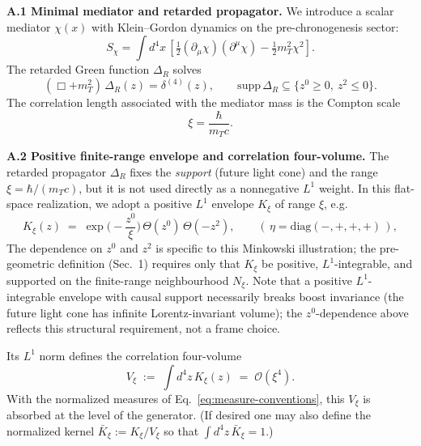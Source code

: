 \documentclass[12pt,a4paper]{article}
\numberwithin{equation}{section}
\begin{document}
\vspace{0.3cm}
\noindent\textbf{A.1 Minimal mediator and retarded propagator.}
We introduce a scalar mediator $\chi(x)$ with Klein--Gordon dynamics on the pre-chronogenesis sector:
\begin{equation}
S_\chi=\!\int d^4x\,\left[\tfrac12(\partial_\mu \chi)(\partial^\mu \chi)-\tfrac12 m_T^2 \chi^2\right].
\tag{A.1}
\end{equation}
The retarded Green function \(\Delta_R\) solves
\begin{equation}
(\Box+m_T^2)\,\Delta_R(z)=\delta^{(4)}(z),\qquad \mathrm{supp}\,\Delta_R\subseteq\{z^0\ge 0,\ z^2\le 0\}.
\tag{A.2}
\end{equation}
The correlation length associated with the mediator mass is the Compton scale
\begin{equation}
\xi=\frac{\hbar}{m_T c}.
\tag{A.3}\label{eq:scales-mediatormass}
\end{equation}

\vspace{0.3cm}
\noindent\textbf{A.2 Positive finite-range envelope and correlation four-volume.}
The retarded propagator $\Delta_R$ fixes the \emph{support} (future light cone) and the
range $\xi=\hbar/(m_Tc)$, but it is not used directly as a nonnegative $L^1$ weight.
In this flat-space realization, we adopt a positive $L^1$ envelope $K_\xi$ of range $\xi$, e.g.
\begin{equation}
K_\xi(z)\;=\;\exp\!\Big(-\frac{z^0}{\xi}\Big)\,\Theta(z^0)\,\Theta(-z^2),
\qquad (\,\eta=\mathrm{diag}(-,+,+,+)\,),
\tag{A.4}
\end{equation}
The dependence on $z^0$ and $z^2$ is specific to this Minkowski illustration; the pre-geometric definition (Sec.~1) requires only that $K_\xi$ be positive, $L^1$-integrable, and supported on the finite-range neighbourhood $N_\xi$. Note that a positive $L^1$-integrable envelope with causal support necessarily breaks boost invariance (the future light cone has infinite Lorentz-invariant volume); the $z^0$-dependence above reflects this structural requirement, not a frame choice.

\noindent Its $L^1$ norm defines the correlation four-volume
\begin{equation}
V_\xi \;:=\;\int d^4z\,K_\xi(z)\;=\;\mathcal O(\xi^4).
\tag{A.4$'$}
\end{equation}
With the normalized measures of Eq.~\eqref{eq:measure-conventions}, this $V_\xi$ is absorbed
at the level of the generator. (If desired one may also define the normalized kernel
$\bar K_\xi:=K_\xi/V_\xi$ so that $\int d^4z\,\bar K_\xi=1$.)
\end{document}
